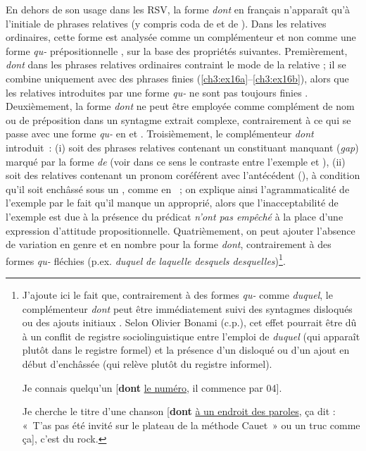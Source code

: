 En dehors de son usage dans les RSV, la forme \textit{dont} en français n’apparaît qu’à l’initiale de phrases relatives (y compris coda de  et de ). Dans les relatives ordinaires, cette forme est analysée comme un complémenteur et non comme une forme \textit{qu-} prépositionnelle \citep{Godard1988,Godard1989,AbeilleEtAl2003c,AbeilleEtAl2006,AbeilleEtAl2007}, sur la base des propriétés suivantes. Premièrement, \textit{dont} dans les phrases relatives ordinaires contraint le mode de la relative ; il se combine uniquement avec des phrases finies (\ref{ch3:ex16a}--\ref{ch3:ex16b}), alors que les relatives introduites par une forme \textit{qu-} ne sont pas toujours finies . Deuxièmement, la forme \textit{dont} ne peut être employée comme complément de nom  ou de préposition  dans un syntagme extrait complexe, contrairement à ce qui se passe avec une forme \textit{qu-} en  et . Troisièmement, le complémenteur \textit{dont} introduit~: (i) soit des phrases relatives contenant un constituant manquant (\textit{gap}) marqué par la forme \textit{de} (voir dans ce sens le contraste entre l’exemple  et ), (ii) soit des relatives contenant un pronom coréférent avec l’antécédent (), à condition qu’il soit enchâssé sous un , comme en ~; on explique ainsi l’agrammaticalité de l’exemple  par le fait qu’il manque un  approprié, alors que l’inacceptabilité de l’exemple  est due à la présence du prédicat \textit{n’ont pas empêché} à la place d’une expression d’attitude propositionnelle. Quatrièmement, on peut ajouter l’absence de variation en genre et en nombre pour la forme \textit{dont}, contrairement à des formes \textit{qu-} fléchies (p.ex. \textit{duquel} {\textbar} \textit{de laquelle {\textbar} desquels {\textbar} desquelles})\footnote{J’ajoute ici le fait que, contrairement à des formes \textit{qu-} comme \textit{duquel}, le complémenteur \textit{dont} peut être immédiatement suivi des syntagmes disloqués  ou des ajouts initiaux . Selon Olivier Bonami (c.p.), cet effet pourrait être dû à un conflit de registre sociolinguistique entre l’emploi de \textit{duquel} (qui apparaît plutôt dans le registre formel) et la présence d’un disloqué ou d’un ajout en début d’enchâssée (qui relève plutôt du registre informel).

\ea \label{ch3:fn5i}
Je connais quelqu’un [\textbf{dont} \uline{le numéro}, il commence par 04].
\z 

\ea \label{ch3:fn5ii} 
Je cherche le titre d’une chanson [\textbf{dont} \uline{à un endroit des paroles}, ça dit : «~T’as pas été invité sur le plateau de la méthode Cauet~» ou un truc comme ça], c’est du rock.
\z 
}.



